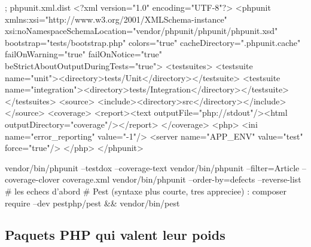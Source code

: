 \documentclass[12pt,a4paper,twoside,openright]{book}
\begin{document}
\begin{codeconf}
; phpunit.xml.dist
<?xml version="1.0" encoding="UTF-8"?>
<phpunit xmlns:xsi="http://www.w3.org/2001/XMLSchema-instance"
         xsi:noNamespaceSchemaLocation="vendor/phpunit/phpunit/phpunit.xsd"
         bootstrap="tests/bootstrap.php" colors="true" cacheDirectory=".phpunit.cache"
         failOnWarning="true" failOnNotice="true" beStrictAboutOutputDuringTests="true">
  <testsuites>
    <testsuite name="unit"><directory>tests/Unit</directory></testsuite>
    <testsuite name="integration"><directory>tests/Integration</directory></testsuite>
  </testsuites>
  <source>
    <include><directory>src</directory></include>
  </source>
  <coverage>
    <report><text outputFile="php://stdout"/><html outputDirectory="coverage"/></report>
  </coverage>
  <php>
    <ini name="error_reporting" value="-1"/>
    <server name="APP_ENV" value="test" force="true"/>
  </php>
</phpunit>
\end{codeconf}

\begin{terminal}
vendor/bin/phpunit --testdox --coverage-text
vendor/bin/phpunit --filter=Article --coverage-clover coverage.xml
vendor/bin/phpunit --order-by=defects --reverse-list    # les echecs d'abord
# Pest (syntaxe plus courte, tres appreciee) : composer require --dev pestphp/pest && vendor/bin/pest
\end{terminal}

\subsection{Paquets PHP qui valent leur poids}
\end{document}
